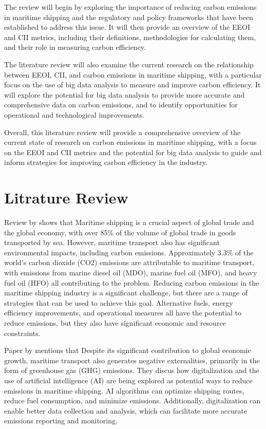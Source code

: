 The review will begin by exploring the importance of reducing carbon emissions in maritime shipping and the regulatory and policy frameworks that have been established to address this issue. It will then provide an overview of the EEOI and CII metrics, including their definitions, methodologies for calculating them, and their role in measuring carbon efficiency.

The literature review will also examine the current research on the relationship between EEOI, CII, and carbon emissions in maritime shipping, with a particular focus on the use of big data analysis to measure and improve carbon efficiency. It will explore the potential for big data analysis to provide more accurate and comprehensive data on carbon emissions, and to identify opportunities for operational and technological improvements.

Overall, this literature review will provide a comprehensive overview of the current state of research on carbon emissions in maritime shipping, with a focus on the EEOI and CII metrics and the potential for big data analysis to guide and inform strategies for improving carbon efficiency in the industry.


\section{Litrature Review}


Review by \cite{en15217910} shows that Maritime shipping is a crucial aspect of global trade and the global economy, with over 85\% of the volume of global trade in goods transported by sea.
However, maritime transport also has significant environmental impacts, including carbon emissions.
Approximately 3.3\% of the world's carbon dioxide (CO2) emissions are attributable to maritime transport, with emissions from marine diesel oil (MDO), marine fuel oil (MFO), and heavy fuel oil (HFO) all contributing to the problem.
Reducing carbon emissions in the maritime shipping industry is a significant challenge, but there are a range of strategies that can be used to achieve this goal.
Alternative fuels, energy efficiency improvements, and operational measures all have the potential to reduce emissions, but they also have significant economic and resource constraints.


Paper by \cite{en15176150} mentions that  Despite its significant contribution to global economic growth, maritime transport also generates negative externalities, primarily in the form of greenhouse gas (GHG) emissions.
They discus how digitalization and the use of artificial intelligence (AI) are being explored as potential ways to reduce emissions in maritime shipping.
AI algorithms can optimize shipping routes, reduce fuel consumption, and minimize emissions. Additionally, digitalization can enable better data collection and analysis, which can facilitate more accurate emissions reporting and monitoring.

